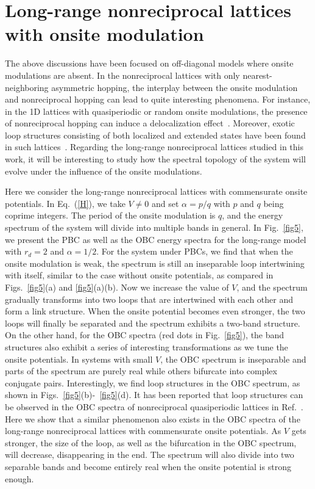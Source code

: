 \documentclass[prb,aps,twocolumn,showpacs]{revtex4-2} %
\begin{document}
\section{Long-range nonreciprocal lattices with onsite modulation}\label{sect4}
The above discussions have been focused on off-diagonal models where onsite modulations are absent. In the nonreciprocal lattices with only nearest-neighboring asymmetric hopping, the interplay between the onsite modulation and nonreciprocal hopping can lead to quite interesting phenomena. For instance, in the 1D lattices with quasiperiodic or random onsite modulations, the presence of nonreciprocal hopping can induce a delocalization effect~\cite{Gong2018PRX,Jiang2019PRB,Zeng2020PRR,Liu2021PRB1,Liu2021PRB2}. Moreover, exotic loop structures consisting of both localized and extended states have been found in such lattices~\cite{Zeng2020PRR}. Regarding the long-range nonreciprocal lattices studied in this work, it will be interesting to study how the spectral topology of the system will evolve under the influence of the onsite modulations. 

Here we consider the long-range nonreciprocal lattices with commensurate onsite potentials. In Eq.~(\ref{H}), we take $V \neq 0$ and set $\alpha = p/q$ with $p$ and $q$ being coprime integers. The period of the onsite modulation is $q$, and the energy spectrum of the system will divide into multiple bands in general. In Fig.~\ref{fig5}, we present the PBC as well as the OBC energy spectra for the long-range model with $r_d=2$ and $\alpha=1/2$. For the system under PBCs, we find that when the onsite modulation is weak, the spectrum is still an inseparable loop intertwining with itself, similar to the case without onsite potentials, as compared in Figs.~\ref{fig5}(a) and \ref{fig5}(a)(b). Now we increase the value of $V$, and the spectrum gradually transforms into two loops that are intertwined with each other and form a link structure. When the onsite potential becomes even stronger, the two loops will finally be separated and the spectrum exhibits a two-band structure. On the other hand, for the OBC spectra (red dots in Fig.~\ref{fig5}), the band structures also exhibit a series of interesting transformations as we tune the onsite potentials. In systems with small $V$, the OBC spectrum is inseparable and parts of the spectrum are purely real while others bifurcate into complex conjugate pairs. Interestingly, we find loop structures in the OBC spectrum, as shown in Figs.~\ref{fig5}(b)-~\ref{fig5}(d). It has been reported that loop structures can be observed in the OBC spectra of nonreciprocal quasiperiodic lattices in Ref.~\cite{Zeng2020PRR}. Here we show that a similar phenomenon also exists in the OBC spectra of the long-range nonreciprocal lattices with commensurate onsite potentials. As $V$ gets stronger, the size of the loop, as well as the bifurcation in the OBC spectrum, will decrease, disappearing in the end. The spectrum will also divide into two separable bands and become entirely real when the onsite potential is strong enough.   
\end{document}
